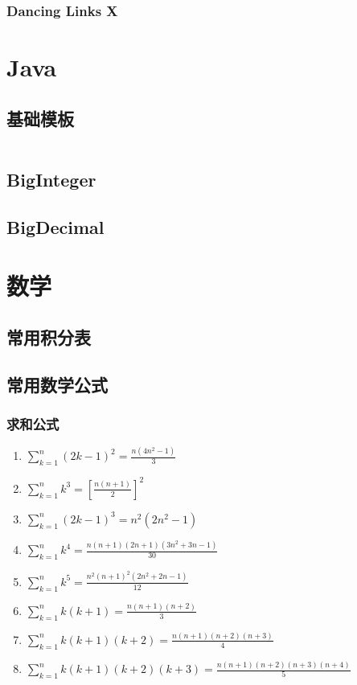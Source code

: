 \documentclass[a4paper]{article}
\newcommand{\javacode}[1]{
    \inputminted[mathescape]{java}{source/#1}
}
\begin{document}
\subsubsection{Dancing Links X}

\section{Java}

\subsection{基础模板}

\javacode{template.java}

\subsection{BigInteger}

\subsection{BigDecimal}

\section{数学}

\subsection{常用积分表}

\subsection{常用数学公式}

\subsubsection{求和公式}

\begin{enumerate}
\item
  $\sum_{k=1}^{n}(2k-1)^2 = \frac{n(4n^2-1)}{3}	$
\item
  $\sum_{k=1}^{n}k^3 = [\frac{n(n+1)}{2}]^2	$
\item
  $\sum_{k=1}^{n}(2k-1)^3 = n^2(2n^2-1)	$
\item
  $\sum_{k=1}^{n}k^4 = \frac{n(n+1)(2n+1)(3n^2+3n-1)}{30}  $
\item
  $\sum_{k=1}^{n}k^5 = \frac{n^2(n+1)^2(2n^2+2n-1)}{12}	$
\item
  $\sum_{k=1}^{n}k(k+1) = \frac{n(n+1)(n+2)}{3}	$
\item
  $\sum_{k=1}^{n}k(k+1)(k+2) = \frac{n(n+1)(n+2)(n+3)}{4} $
\item
  $\sum_{k=1}^{n}k(k+1)(k+2)(k+3) = \frac{n(n+1)(n+2)(n+3)(n+4)}{5} $
\end{enumerate}
\end{document}
